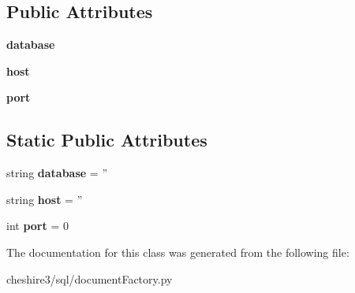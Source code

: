 \subsection*{Public Attributes}
\begin{DoxyCompactItemize}
\item 
\hypertarget{classcheshire3_1_1sql_1_1document_factory_1_1_postgres_document_factory_a077e6b755031d5f36b9af9d6c03f953b}{{\bfseries database}}\label{classcheshire3_1_1sql_1_1document_factory_1_1_postgres_document_factory_a077e6b755031d5f36b9af9d6c03f953b}

\item 
\hypertarget{classcheshire3_1_1sql_1_1document_factory_1_1_postgres_document_factory_acbea1829bd7229e8b1d710c392f8cf92}{{\bfseries host}}\label{classcheshire3_1_1sql_1_1document_factory_1_1_postgres_document_factory_acbea1829bd7229e8b1d710c392f8cf92}

\item 
\hypertarget{classcheshire3_1_1sql_1_1document_factory_1_1_postgres_document_factory_a0fe43151d8ef65923c5ea53824bf72cd}{{\bfseries port}}\label{classcheshire3_1_1sql_1_1document_factory_1_1_postgres_document_factory_a0fe43151d8ef65923c5ea53824bf72cd}

\end{DoxyCompactItemize}
\subsection*{Static Public Attributes}
\begin{DoxyCompactItemize}
\item 
\hypertarget{classcheshire3_1_1sql_1_1document_factory_1_1_postgres_document_factory_a44111bffd76d41e1ef00e89113f1ebba}{string {\bfseries database} = ''}\label{classcheshire3_1_1sql_1_1document_factory_1_1_postgres_document_factory_a44111bffd76d41e1ef00e89113f1ebba}

\item 
\hypertarget{classcheshire3_1_1sql_1_1document_factory_1_1_postgres_document_factory_aa9438a58101b072eab2231fd64249339}{string {\bfseries host} = ''}\label{classcheshire3_1_1sql_1_1document_factory_1_1_postgres_document_factory_aa9438a58101b072eab2231fd64249339}

\item 
\hypertarget{classcheshire3_1_1sql_1_1document_factory_1_1_postgres_document_factory_aa22ad8ced48fc7bb857af6b87eef3dad}{int {\bfseries port} = 0}\label{classcheshire3_1_1sql_1_1document_factory_1_1_postgres_document_factory_aa22ad8ced48fc7bb857af6b87eef3dad}

\end{DoxyCompactItemize}


The documentation for this class was generated from the following file\-:\begin{DoxyCompactItemize}
\item 
cheshire3/sql/document\-Factory.\-py\end{DoxyCompactItemize}
